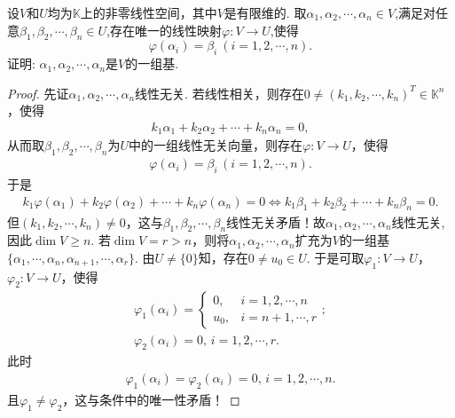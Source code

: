 \documentclass[../../main.tex]{subfiles}%
\begin{document}
\begin{example}
设$V$和$U$均为$\mathbb{K}$上的非零线性空间，其中$V$是有限维的. 取$\alpha_1,\alpha_2,\cdots,\alpha_n \in V$,满足对任意$\beta_1,\beta_2,\cdots,\beta_n \in U$,存在唯一的线性映射$\varphi:V \to U$,使得
$$\varphi(\alpha_i)=\beta_i\ (i=1,2,\cdots,n).$$
证明: $\alpha_1,\alpha_2,\cdots,\alpha_n$是$V$的一组基.
\end{example}
\begin{proof}
先证$\alpha_1,\alpha_2,\cdots,\alpha_n$线性无关. 若线性相关，则存在$0 \ne (k_1,k_2,\cdots,k_n)^T \in \mathbb{K}^n$，使得
\begin{align*}
k_1\alpha_1 + k_2\alpha_2 + \cdots + k_n\alpha_n = 0,
\end{align*}
从而取$\beta_1,\beta_2,\cdots,\beta_n$为$U$中的一组线性无关向量，则存在$\varphi:V \rightarrow U$，使得
\begin{align*}
\varphi(\alpha_i) = \beta_i \, (i=1,2,\cdots,n).
\end{align*}
于是
\begin{align*}
k_1\varphi(\alpha_1) + k_2\varphi(\alpha_2) + \cdots + k_n\varphi(\alpha_n) = 0 \Longleftrightarrow k_1\beta_1 + k_2\beta_2 + \cdots + k_n\beta_n = 0.
\end{align*}
但$(k_1,k_2,\cdots,k_n) \ne 0$，这与$\beta_1,\beta_2,\cdots,\beta_n$线性无关矛盾！故$\alpha_1,\alpha_2,\cdots,\alpha_n$线性无关,
因此$\dim V \geqslant n$. 若$\dim V = r > n$，则将$\alpha_1,\alpha_2,\cdots,\alpha_n$扩充为$V$的一组基$\{\alpha_1,\cdots,\alpha_n,\alpha_{n+1},\cdots,\alpha_r\}$.
由$U \ne \{0\}$知，存在$0 \ne u_0 \in U$. 于是可取$\varphi_1:V \rightarrow U$，$\varphi_2:V \rightarrow U$，使得
\begin{gather*}
\varphi_1(\alpha_i) = \begin{cases} 
0, & i=1,2,\cdots,n \\
u_0, & i=n+1,\cdots,r 
\end{cases};
\\
\varphi_2(\alpha_i) = 0, \, i=1,2,\cdots,r.
\end{gather*}
此时
\begin{align*}
\varphi_1(\alpha_i) = \varphi_2(\alpha_i) = 0, \, i=1,2,\cdots,n.
\end{align*}
且$\varphi_1 \ne \varphi_2$，这与条件中的唯一性矛盾！
\end{proof}
\end{document}
